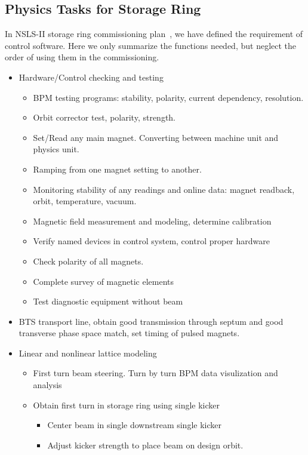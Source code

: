 \documentclass[letterpaper,showtrims]{memoir}
\begin{document}
\subsection{Physics Tasks for Storage Ring}

In NSLS-II storage ring commissioning plan~\cite{willeke_2009_assumptions,
  krinsky_2010_nsls-ii}, we have defined the requirement of control
software. Here we only summarize the functions needed, but neglect the
order of using them in the commissioning.

\begin{itemize}
\item Hardware/Control checking and testing
  \begin{itemize}
  \item BPM testing programs: stability, polarity, current dependency, resolution.
  \item Orbit corrector test, polarity, strength.
  \item Set/Read any main magnet. Converting between machine unit and physics unit.
  \item Ramping from one magnet setting to another.
  \item Monitoring stability of any readings and online data: magnet
    readback, orbit, temperature, vacuum.
  \item Magnetic field measurement and modeling, determine calibration
  \item Verify named devices in control system, control proper hardware
  \item Check polarity of all magnets.
  \item Complete survey of magnetic elements
  \item Test diagnostic equipment without beam
  \end{itemize}
\item BTS transport line, obtain good transmission through septum and good
  transverse phase space match, set timing of pulsed magnets.
\item Linear and nonlinear lattice modeling
  \begin{itemize}%
  \item First turn beam steering. Turn by turn BPM data visulization and analysis
  \item Obtain first turn in storage ring using single kicker
    \begin{itemize}%
    \item Center beam in single downstream single kicker
    \item Adjust kicker strength to place beam on design orbit.

\end{itemize}
\end{itemize}
\end{itemize}
\end{document}
